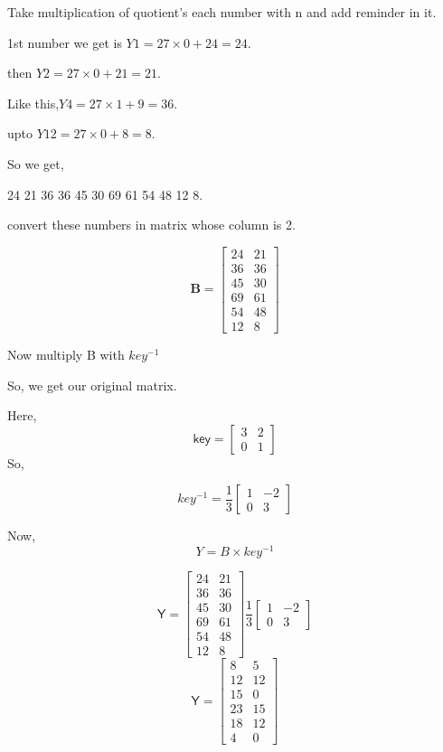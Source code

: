 \documentclass[12pt]{article}
\begin{document}
    Take multiplication of  quotient's each number with n and add reminder in it.
    
    1st number we get is  $ Y1=27\times0 + 24 = 24.$
    
    then $ Y2=27\times0 + 21 = 21. $
    
    Like this,$ Y4=27\times1 + 9 = 36 $.
    
   upto  $Y12 = 27\times0 + 8 = 8$.
    
    So we get,
    \begin{center}
        24 21 36 36 45 30 69 61 54 48 12 8.
    \end{center}
    
    convert these numbers in  matrix whose column is 2.
    
    $$\textbf{B} =
    \begin{bmatrix}
         24 & 21\\
        36 & 36\\
        45 & 30\\
        69 & 61\\
        54 & 48\\
        12 & 8
    \end{bmatrix}
    $$
    
    Now multiply B with $key^{-1}$
    
     So, we get our original matrix.
    
    Here,
    $$\textsf{key} =
    \begin{bmatrix}
         3 & 2\\
        0 & 1
    \end{bmatrix}
    $$
    So,
    
    \[ key^{-1} = \frac{1}{3}
    \begin{bmatrix}
         1 & -2\\
        0 & 3
    \end{bmatrix}\]
    
   Now,
   \[ Y = B\times key^{-1}\]
   
   \[\textsf{Y} =
   \begin{bmatrix}
         24 & 21\\
        36 & 36\\
        45 & 30\\
        69 & 61\\
        54 & 48\\
        12   & 8
    \end{bmatrix} \frac{1}{3}
    \begin{bmatrix}
         1 & -2\\
        0 & 3
    \end{bmatrix}\]
    $$\textsf{Y} =
   \begin{bmatrix}
         8 & 5\\
        12 & 12\\
        15 & 0\\
        23 & 15\\
        18 & 12\\
        4 & 0
    \end{bmatrix}
    $$
    
\end{document}
